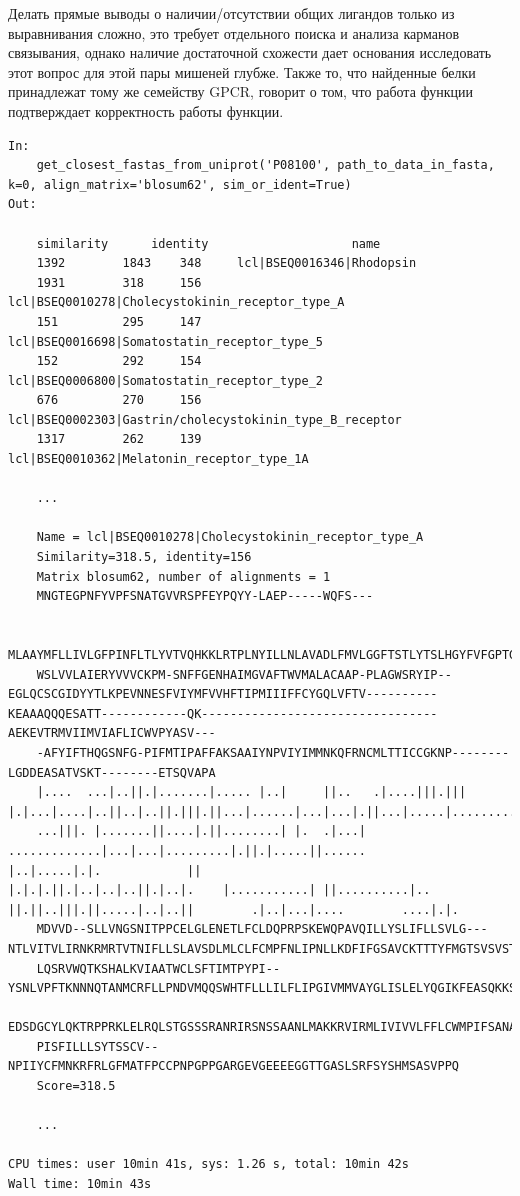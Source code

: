 \documentclass[a4paper,14pt]{article}         %
\begin{document}
Делать прямые выводы о наличии/отсутствии общих лигандов только из выравнивания сложно, это требует отдельного поиска и анализа карманов связывания, однако наличие достаточной схожести дает основания исследовать этот вопрос для этой пары мишеней глубже. Также то, что найденные белки принадлежат тому же семейству GPCR, говорит о том, что работа функции подтверждает корректность работы функции.
\begin{lstlisting}[label={lst:fasta}, caption={Определение сходства мишеней по а/к последовательности посредством Biopython, входные данные~--- ID Uniptor человеческого родопсина из семейства GPCR.}]
In:
	get_closest_fastas_from_uniprot('P08100', path_to_data_in_fasta, k=0, align_matrix='blosum62', sim_or_ident=True)
Out:

	similarity 		identity 					name
	1392 	 	1843 	348  	lcl|BSEQ0016346|Rhodopsin
	1931 	 	318 	156 	lcl|BSEQ0010278|Cholecystokinin_receptor_type_A
	151 	 	295 	147 	lcl|BSEQ0016698|Somatostatin_receptor_type_5
	152 	 	292 	154 	lcl|BSEQ0006800|Somatostatin_receptor_type_2
	676 	 	270 	156 	lcl|BSEQ0002303|Gastrin/cholecystokinin_type_B_receptor
	1317 	 	262 	139 	lcl|BSEQ0010362|Melatonin_receptor_type_1A

	...
	
	Name = lcl|BSEQ0010278|Cholecystokinin_receptor_type_A
	Similarity=318.5, identity=156
	Matrix blosum62, number of alignments = 1
	MNGTEGPNFYVPFSNATGVVRSPFEYPQYY-LAEP-----WQFS---
	
	MLAAYMFLLIVLGFPINFLTLYVTVQHKKLRTPLNYILLNLAVADLFMVLGGFTSTLYTSLHGYFVFGPTGCNLEGFFATLGGEIAL	
	WSLVVLAIERYVVVCKPM-SNFFGENHAIMGVAFTWVMALACAAP-PLAGWSRYIP--EGLQCSCGIDYYTLKPEVNNESFVIYMFVVHFTIPMIIIFFCYGQLVFTV----------KEAAAQQQESATT------------QK---------------------------------AEKEVTRMVIIMVIAFLICWVPYASV---
	-AFYIFTHQGSNFG-PIFMTIPAFFAKSAAIYNPVIYIMMNKQFRNCMLTTICCGKNP--------LGDDEASATVSKT--------ETSQVAPA
	|....  ...|..||.|.......|..... |..|     ||..   .|....|||.|||   |.|...|....|..||..|..||.|||.||...|......|...|...|.||...|.....|...........||....|||
	...|||. |.......||....|.||........| |.  .|...|  .............|...|...|.........|.||.|.....||......          |..|.....|.|.            ||                                 |.|.|.||.|..|..|..||.|..|.    |...........| ||..........|..  ||.||..|||.||.....|..|..||        .|..|...|....        ....|.|.
	MDVVD--SLLVNGSNITPPCELGLENETLFCLDQPRPSKEWQPAVQILLYSLIFLLSVLG---NTLVITVLIRNKRMRTVTNIFLLSLAVSDLMLCLFCMPFNLIPNLLKDFIFGSAVCKTTTYFMGTSVSVSTFNLVAISLERYGAICKP
	LQSRVWQTKSHALKVIAATWCLSFTIMTPYPI--YSNLVPFTKNNNQTANMCRFLLPNDVMQQSWHTFLLLILFLIPGIVMMVAYGLISLELYQGIKFEASQKKSAKERKPSTTSSGKY
	EDSDGCYLQKTRPPRKLELRQLSTGSSSRANRIRSNSSAANLMAKKRVIRMLIVIVVLFFLCWMPIFSANAWRAYDTASAERRLSGT
	PISFILLLSYTSSCV--NPIIYCFMNKRFRLGFMATFPCCPNPGPPGARGEVGEEEEGGTTGASLSRFSYSHMSASVPPQ
	Score=318.5
	
	...
	
CPU times: user 10min 41s, sys: 1.26 s, total: 10min 42s
Wall time: 10min 43s
\end{lstlisting}
\end{document}
